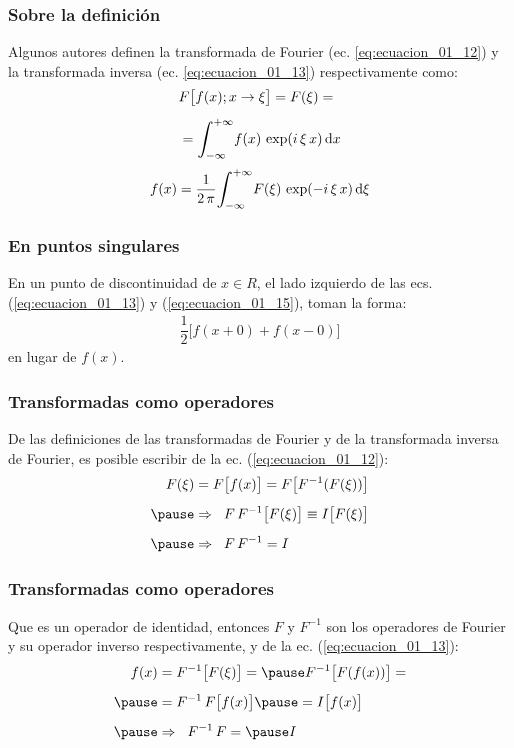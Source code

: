 \begin{frame}
\frametitle{Sobre la definición}
Algunos autores definen la transformada de Fourier  (ec. \ref{eq:ecuacion_01_12}) y la transformada inversa (ec. \ref{eq:ecuacion_01_13}) respectivamente como:
\pause
\begin{eqnarray}
\begin{aligned}[b]
&F \big[ f (x); x \to \xi \big] = F (\xi) = \\[0.5em]
&= \scaleint{6ex}_{\bs -\infty}^{+\infty} f (x) \, \exp(i \, \xi \, x) \dd{x}
\label{eq:ecuacion_01_14}
\end{aligned}
\end{eqnarray}
\begin{eqnarray}
f (x) = \dfrac{1}{2 \, \pi} \scaleint{6ex}_{\bs -\infty}^{+\infty} F (\xi) \, \exp(-i \, \xi \, x) \dd{\xi}
\label{eq:ecuacion_01_15}
\end{eqnarray}
\end{frame}
\begin{frame}
\frametitle{En puntos singulares}
En un punto de discontinuidad de $x \in R$, el lado izquierdo de las ecs. (\ref{eq:ecuacion_01_13}) y (\ref{eq:ecuacion_01_15}), toman la forma:
\pause
\begin{align*}
\dfrac{1}{2} \big[ f (x + 0) + f (x - 0) \big]
\end{align*}
en lugar de $f (x)$.
\end{frame}
\begin{frame}
\frametitle{Transformadas como operadores}
De las definiciones de las transformadas de Fourier y de la transformada inversa de Fourier, es posible escribir de la ec. (\ref{eq:ecuacion_01_12}):
\pause
\begin{eqnarray*}
\begin{aligned}
F (\xi) &= F \big[ f (x) \big] = F \big[ F^{-1} (F (\xi)) \big] \\[0.5em] \pause
&\Rightarrow \hspace{0.2cm} F \, F^{-1} \big[ F (\xi) \big] \equiv I \big[ F (\xi) \big] \\[0.5em] \pause
&\Rightarrow \hspace{0.2cm} F \, F^{-1} = I
\end{aligned}
\end{eqnarray*}
\end{frame}
\begin{frame}
\frametitle{Transformadas como operadores}
Que es un operador de identidad, entonces $F$ y $F^{-1}$ son los operadores de Fourier y su operador inverso respectivamente, y de la ec. (\ref{eq:ecuacion_01_13}):
\pause
\begin{eqnarray}
\begin{aligned}[b]
f (x) &= F^{-1} \big[ F (\xi) \big] = \pause F^{-1} \big[ F(f (x)) \big] = \\[0.5em] \pause 
&= F^{-1} \, F \big[ f (x) \big] \pause = I \big[ f (x) \big] \\[0.5em] \pause
&\Rightarrow \hspace{0.2cm} F^{-1} \, F = \pause I
\end{aligned}
\label{eq:ecuacion_01_16}
\end{eqnarray}
\end{frame}

